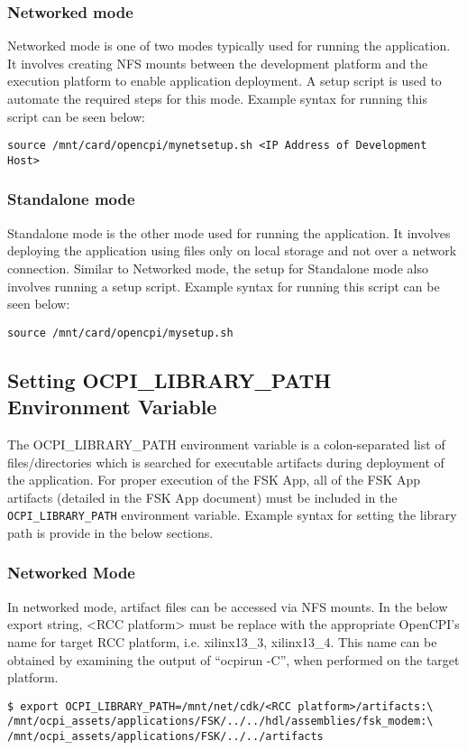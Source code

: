 \begin{flushleft}
\subsubsection{Networked mode}
Networked mode is one of two modes typically used for running the application. It involves creating NFS mounts between the development platform and the execution platform to enable application deployment. A setup script is used to automate the required steps for this mode. Example syntax for running this script can be seen below:
\begin{verbatim}
source /mnt/card/opencpi/mynetsetup.sh <IP Address of Development Host>
\end{verbatim}
\subsubsection{Standalone mode}
Standalone mode is the other mode used for running the application. It involves deploying the application using files only on local storage and not over a network connection. Similar to Networked mode, the setup for Standalone mode also involves running a setup script. Example syntax for running this script can be seen below:
\begin{verbatim}
source /mnt/card/opencpi/mysetup.sh
\end{verbatim}
\subsection{Setting OCPI\_LIBRARY\_PATH Environment Variable}
The OCPI\_LIBRARY\_PATH environment variable is a colon-separated list of files/directories which is searched for executable artifacts during deployment of the application. For proper execution of the FSK App, all of the FSK App artifacts (detailed in the FSK App document) must be included in the \texttt{OCPI\_LIBRARY\_PATH} environment variable. Example syntax for setting the library path is provide in the below sections.
\subsubsection{Networked Mode}
In networked mode, artifact files can be accessed via NFS mounts. In the below export string, <RCC platform> must be replace with the appropriate OpenCPI's name for target RCC platform, i.e. xilinx13\_3, xilinx13\_4. This name can be obtained by examining the output of ``ocpirun -C'', when performed on the target platform.
\begin{verbatim}
$ export OCPI_LIBRARY_PATH=/mnt/net/cdk/<RCC platform>/artifacts:\
/mnt/ocpi_assets/applications/FSK/../../hdl/assemblies/fsk_modem:\
/mnt/ocpi_assets/applications/FSK/../../artifacts
\end{verbatim}


\end{flushleft}
